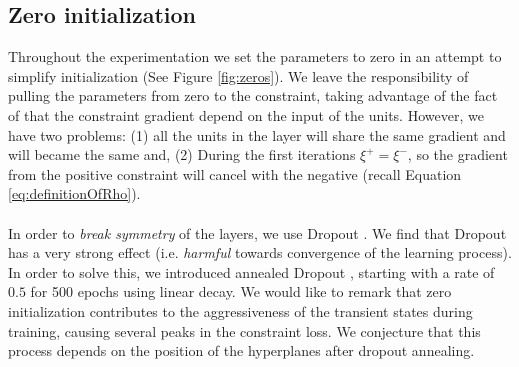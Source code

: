 \subsection{Zero initialization}\label{subsec:zero}

Throughout the experimentation we set the parameters to zero in an attempt to simplify initialization (See Figure \ref{fig:zeros}). We leave the responsibility of pulling the parameters from zero to the constraint, taking advantage of the fact of that the constraint gradient depend on the input of the units. However, we have two problems: (1) all the units in the layer will share the same gradient and will became the same and, (2) During the first iterations $\xi^+ = \xi^-$, so the gradient from the positive constraint will cancel with the negative (recall Equation \ref{eq:definitionOfRho}).
\\\\
In order to \emph{break symmetry} of the layers, we use Dropout \cite{dropout}. We find that Dropout has a very strong effect (i.e. \emph{harmful} towards convergence of the learning process). In order to solve this, we introduced annealed Dropout \cite{dropoutAnnealing}, starting with a rate of $0.5$ for 500 epochs using linear decay. We would like to remark that zero initialization  contributes to the aggressiveness of the transient states during training, causing  several peaks in the constraint loss. We conjecture that this process depends on the position of the hyperplanes after dropout annealing. 

